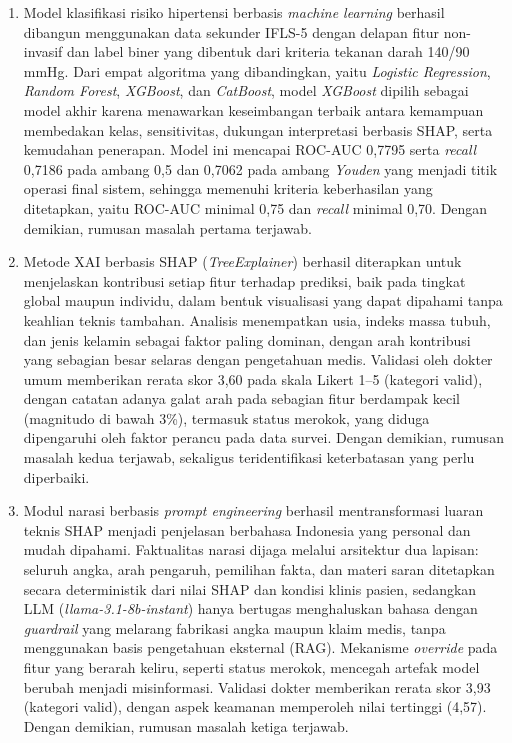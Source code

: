 \begin{enumerate}
    \item Model klasifikasi risiko hipertensi berbasis \textit{machine learning} berhasil dibangun menggunakan data sekunder IFLS-5 dengan delapan fitur non-invasif dan label biner yang dibentuk dari kriteria tekanan darah 140/90 mmHg. Dari empat algoritma yang dibandingkan, yaitu \textit{Logistic Regression}, \textit{Random Forest}, \textit{XGBoost}, dan \textit{CatBoost}, model \textit{XGBoost} dipilih sebagai model akhir karena menawarkan keseimbangan terbaik antara kemampuan membedakan kelas, sensitivitas, dukungan interpretasi berbasis SHAP, serta kemudahan penerapan. Model ini mencapai ROC-AUC 0,7795 serta \textit{recall} 0,7186 pada ambang 0,5 dan 0,7062 pada ambang \textit{Youden} yang menjadi titik operasi final sistem, sehingga memenuhi kriteria keberhasilan yang ditetapkan, yaitu ROC-AUC minimal 0,75 dan \textit{recall} minimal 0,70. Dengan demikian, rumusan masalah pertama terjawab.

    \item Metode XAI berbasis SHAP (\textit{TreeExplainer}) berhasil diterapkan untuk menjelaskan kontribusi setiap fitur terhadap prediksi, baik pada tingkat global maupun individu, dalam bentuk visualisasi yang dapat dipahami tanpa keahlian teknis tambahan. Analisis menempatkan usia, indeks massa tubuh, dan jenis kelamin sebagai faktor paling dominan, dengan arah kontribusi yang sebagian besar selaras dengan pengetahuan medis. Validasi oleh dokter umum memberikan rerata skor 3,60 pada skala Likert 1--5 (kategori valid), dengan catatan adanya galat arah pada sebagian fitur berdampak kecil (magnitudo di bawah 3\%), termasuk status merokok, yang diduga dipengaruhi oleh faktor perancu pada data survei. Dengan demikian, rumusan masalah kedua terjawab, sekaligus teridentifikasi keterbatasan yang perlu diperbaiki.

    \item Modul narasi berbasis \textit{prompt engineering} berhasil mentransformasi luaran teknis SHAP menjadi penjelasan berbahasa Indonesia yang personal dan mudah dipahami. Faktualitas narasi dijaga melalui arsitektur dua lapisan: seluruh angka, arah pengaruh, pemilihan fakta, dan materi saran ditetapkan secara deterministik dari nilai SHAP dan kondisi klinis pasien, sedangkan LLM (\textit{llama-3.1-8b-instant}) hanya bertugas menghaluskan bahasa dengan \textit{guardrail} yang melarang fabrikasi angka maupun klaim medis, tanpa menggunakan basis pengetahuan eksternal (RAG). Mekanisme \textit{override} pada fitur yang berarah keliru, seperti status merokok, mencegah artefak model berubah menjadi misinformasi. Validasi dokter memberikan rerata skor 3,93 (kategori valid), dengan aspek keamanan memperoleh nilai tertinggi (4,57). Dengan demikian, rumusan masalah ketiga terjawab.
\end{enumerate}

